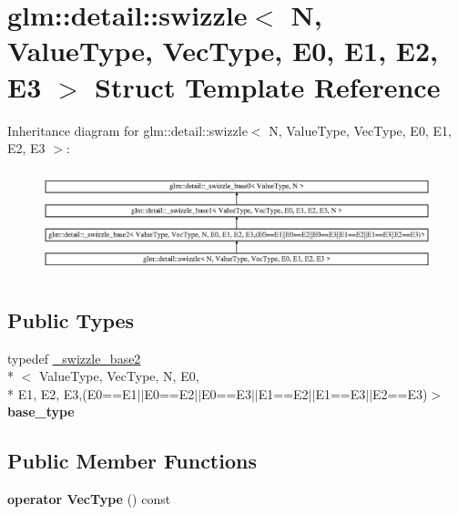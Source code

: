 \hypertarget{structglm_1_1detail_1_1swizzle}{\section{glm\-:\-:detail\-:\-:swizzle$<$ N, Value\-Type, Vec\-Type, E0, E1, E2, E3 $>$ Struct Template Reference}
\label{structglm_1_1detail_1_1swizzle}
}
Inheritance diagram for glm\-:\-:detail\-:\-:swizzle$<$ N, Value\-Type, Vec\-Type, E0, E1, E2, E3 $>$\-:\begin{figure}[H]
\begin{center}
\leavevmode
\includegraphics[height=3.072702cm]{structglm_1_1detail_1_1swizzle}
\end{center}
\end{figure}
\subsection*{Public Types}
\begin{DoxyCompactItemize}
\item 
\hypertarget{structglm_1_1detail_1_1swizzle_a6f5b33550379282023990c48c29162f6}{typedef \hyperlink{structglm_1_1detail_1_1__swizzle__base2}{\-\_\-swizzle\-\_\-base2}\\*
$<$ Value\-Type, Vec\-Type, N, E0, \\*
E1, E2, E3,(E0==E1$\vert$$\vert$E0==E2$\vert$$\vert$E0==E3$\vert$$\vert$E1==E2$\vert$$\vert$E1==E3$\vert$$\vert$E2==E3)$>$ {\bfseries base\-\_\-type}}\label{structglm_1_1detail_1_1swizzle_a6f5b33550379282023990c48c29162f6}

\end{DoxyCompactItemize}
\subsection*{Public Member Functions}
\begin{DoxyCompactItemize}
\item 
\hypertarget{structglm_1_1detail_1_1swizzle_ac290a0b7725247c5971c8fb91f28992b}{{\bfseries operator Vec\-Type} () const }\label{structglm_1_1detail_1_1swizzle_ac290a0b7725247c5971c8fb91f28992b}

\end{DoxyCompactItemize}
